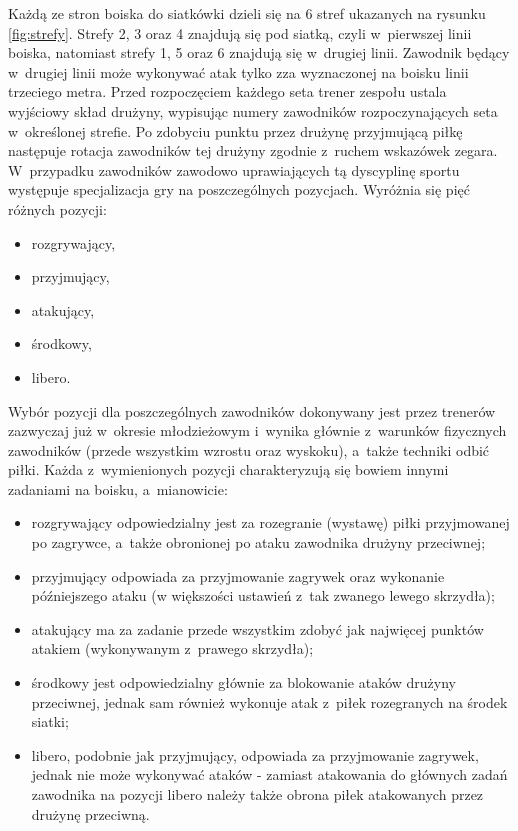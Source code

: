 \documentclass[a4paper,twoside,12pt]{book}
\begin{document}
Każdą ze stron boiska do siatkówki dzieli się na 6 stref ukazanych na rysunku \ref{fig:strefy}. Strefy 2, 3 oraz 4 znajdują się pod siatką, czyli w~pierwszej linii boiska, natomiast strefy 1, 5 oraz 6 znajdują się w~drugiej linii. Zawodnik będący w~drugiej linii może wykonywać atak tylko zza wyznaczonej na boisku linii trzeciego metra. Przed rozpoczęciem każdego seta trener zespołu ustala wyjściowy skład drużyny, wypisując numery zawodników rozpoczynających seta w~określonej strefie. Po zdobyciu punktu przez drużynę przyjmującą piłkę następuje rotacja zawodników tej drużyny zgodnie z~ruchem wskazówek zegara. W~przypadku zawodników zawodowo uprawiających tą dyscyplinę sportu występuje specjalizacja gry na poszczególnych pozycjach. Wyróżnia się pięć różnych pozycji:
\begin{itemize}
\item rozgrywający,
\item przyjmujący,
\item atakujący,
\item środkowy,
\item libero.
\end{itemize}
Wybór pozycji dla poszczególnych zawodników dokonywany jest przez trenerów zazwyczaj już w~okresie młodzieżowym i~wynika głównie z~warunków fizycznych zawodników (przede wszystkim wzrostu oraz wyskoku), a~także techniki odbić piłki. Każda z~wymienionych pozycji charakteryzują się bowiem innymi zadaniami na boisku, a~mianowicie:
\begin{itemize}
\item rozgrywający odpowiedzialny jest za rozegranie (wystawę) piłki przyjmowanej po zagrywce, a~także obronionej po ataku zawodnika drużyny przeciwnej;
\item przyjmujący odpowiada za przyjmowanie zagrywek oraz wykonanie późniejszego ataku (w większości ustawień z~tak zwanego lewego skrzydła);
\item atakujący ma za zadanie przede wszystkim zdobyć jak najwięcej punktów atakiem (wykonywanym z~prawego skrzydła);
\item środkowy jest odpowiedzialny głównie za blokowanie ataków drużyny przeciwnej, jednak sam również wykonuje atak z~piłek rozegranych na środek siatki;
\item libero, podobnie jak przyjmujący, odpowiada za przyjmowanie zagrywek, jednak nie może wykonywać ataków - zamiast atakowania do głównych zadań zawodnika na pozycji libero należy także obrona piłek atakowanych przez drużynę przeciwną.
\end{itemize}
\end{document}
